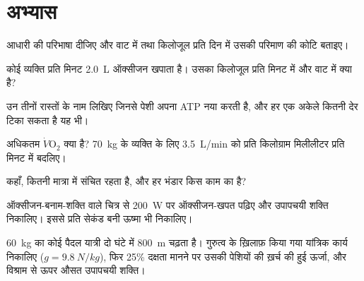 \section{अभ्यास}

\begin{exercise}[$\star$]\label{exo:g10:exercise-and-energy:1}
आधारी  की परिभाषा दीजिए और वाट में तथा किलोजूल प्रति दिन में उसकी
परिमाण की कोटि बताइए।
\end{exercise}

\begin{exercise}[$\star$]\label{exo:g10:exercise-and-energy:2}
कोई व्यक्ति प्रति मिनट \qty{2.0}{L} ऑक्सीजन खपाता है। उसका 
किलोजूल प्रति मिनट में और वाट में क्या है?
\end{exercise}

\begin{exercise}[$\star$]\label{exo:g10:exercise-and-energy:3}
उन तीनों रास्तों के नाम लिखिए जिनसे पेशी अपना ATP नया करती है, और हर एक
अकेले कितनी देर टिका सकता है यह भी।
\end{exercise}

\begin{exercise}[$\star$]\label{exo:g10:exercise-and-energy:4}
अधिकतम $\dot V\!\mathrm{O_2}$ क्या है? \qty{70}{kg} के व्यक्ति के लिए
\qty{3.5}{L/min} को प्रति किलोग्राम मिलीलीटर प्रति मिनट में बदलिए।
\end{exercise}

\begin{exercise}[$\star$]\label{exo:g10:exercise-and-energy:5}
 कहाँ, कितनी मात्रा में संचित रहता है, और हर भंडार किस काम का है?
\end{exercise}

\begin{exercise}[$\star\star$]\label{exo:g10:exercise-and-energy:6}
ऑक्सीजन-बनाम-शक्ति वाले चित्र से \qty{200}{W} पर ऑक्सीजन-खपत पढ़िए और
उपापचयी शक्ति निकालिए। इससे प्रति सेकंड बनी ऊष्मा भी निकालिए।
\end{exercise}

\begin{exercise}[$\star\star$]\label{exo:g10:exercise-and-energy:7}
\qty{60}{kg} का कोई पैदल यात्री दो घंटे में \qty{800}{m} चढ़ता है।
गुरुत्व के ख़िलाफ़ किया गया यांत्रिक कार्य निकालिए
($g = \qty{9.8}{N/kg}$), फिर 25\% दक्षता मानने पर उसकी पेशियों की ख़र्च
की हुई ऊर्जा, और विश्राम से ऊपर औसत उपापचयी शक्ति।
\end{exercise}

